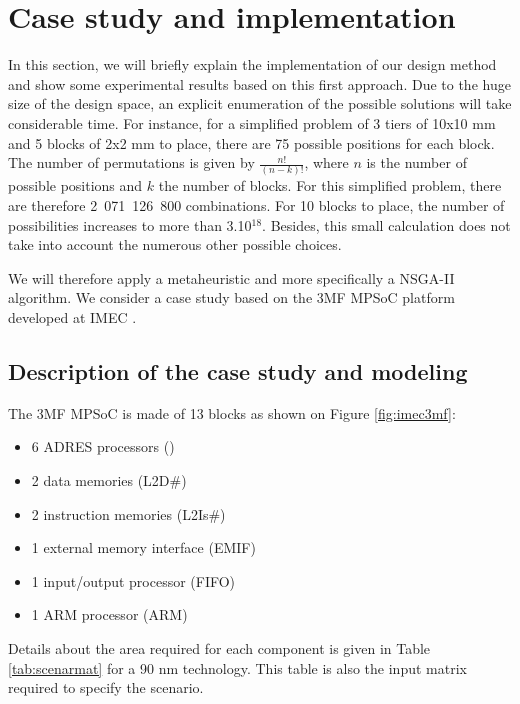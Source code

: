 \section{Case study and implementation}
In this section, we will briefly explain the implementation of our design method and show some experimental results based on this first approach. Due to the huge size of the design space, an explicit enumeration of the possible solutions will take considerable time. For instance, for a simplified problem of 3 tiers of 10x10 mm and 5 blocks of 2x2 mm to place, there are 75 possible positions for each block. The number of permutations is given by $\frac{n!}{(n-k)!}$, where $n$ is the number of possible positions and $k$ the number of blocks. For this simplified problem, there are therefore 2~071~126~800 combinations. For 10 blocks to place, the number of possibilities increases to more than 3.10$^{18}$. Besides, this small calculation does not take into account the numerous other possible choices.

We will therefore apply a metaheuristic and more specifically a NSGA-II algorithm. We consider a case study based on the 3MF MPSoC platform developed at IMEC \cite{dmilojev08b}.

\subsection{Description of the case study and modeling}
The 3MF MPSoC is made of 13 blocks as shown on Figure \ref{fig:imec3mf}:
\begin{itemize}
\item 6 ADRES processors (\cite{conf/fpl/VeredasSMM05})
\item 2 data memories (L2D\#)
\item 2 instruction memories (L2Is\#)
\item 1 external memory interface (EMIF)
\item 1 input/output processor (FIFO)
\item 1 ARM processor (ARM)
\end{itemize}
Details about the area required for each component is given in Table \ref{tab:scenarmat} for a 90 nm technology. This table is also the input matrix required to specify the scenario.

